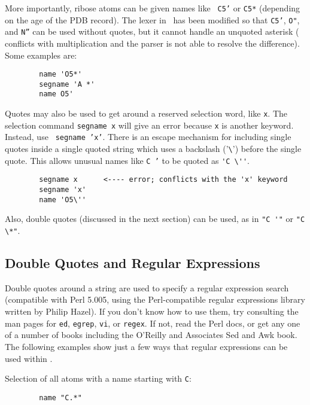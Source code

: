   More importantly, ribose atoms can be given names like {\tt
C5'} or {\tt C5*} (depending on the age of the PDB record).  The lexer
in \VMD\ has been modified so that {\tt C5'}, {\tt O"}, and {\tt N''}
can be used without quotes, but it cannot handle an
unquoted asterisk ({\tt *} conflicts with multiplication and the parser
is not able to resolve the difference).  Some examples are:

\begin{verbatim}
        name 'O5*'
        segname 'A *'
        name O5'
\end{verbatim}

  Quotes may also be used to get around a reserved selection
word, like {\tt x}.  The selection command {\tt segname x} will give
an error because {\tt x} is another keyword.  Instead, use {\tt
segname 'x'}.  There is an escape mechanism for including single
quotes inside a single quoted string which uses a backslash
('\verb!\!') before the single quote.  This allows unusual names like
{\tt C '} to be quoted as \verb!'C \''!.

\begin{verbatim}
        segname x      <---- error; conflicts with the 'x' keyword
        segname 'x'
        name 'O5\''
\end{verbatim}

\noindent Also, double quotes (discussed in the next section) can be used, 
as in \verb!"C '"! or \verb!"C \*"!.

\subsection{Double Quotes and Regular Expressions}
\label{ug:topic:selections:regex}
Double quotes around a string are used to specify a regular expression search (compatible with Perl 5.005, using 
the Perl-compatible regular expressions library written by Philip Hazel).
If you don't know how to use them, try consulting the man pages for {\tt ed},
{\tt egrep}, {\tt vi}, or {\tt regex}.  If not, read the Perl docs, or get
any one of a number of books including the O'Reilly and Associates Sed
and Awk book.  The following examples show just a few ways that regular
expressions can be used within \VMD.

\noindent Selection of all atoms with a name starting with {\tt C}:

\begin{verbatim}
        name "C.*"
\end{verbatim}

